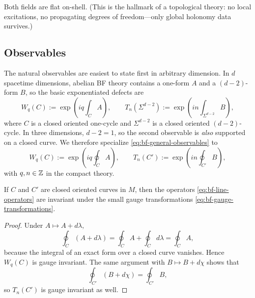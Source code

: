\noindent Both fields are flat on-shell.  (This is the hallmark of a topological theory: no local excitations, no propagating degrees of freedom---only global holonomy data survives.)

\subsection{Observables}

The natural observables are easiest to state first in arbitrary dimension. In $d$ spacetime dimensions, abelian BF theory contains a one-form $A$ and a $(d-2)$-form $B$, so the basic exponentiated defects are
\begin{equation}\label{eq:bf-general-observables}
W_q(C) := \exp\!\left(iq\int_C A\right),
\qquad
T_n(\Sigma^{d-2}) := \exp\!\left(in\int_{\Sigma^{d-2}} B\right),
\end{equation}
where $C$ is a closed oriented one-cycle and $\Sigma^{d-2}$ is a closed oriented $(d-2)$-cycle. In three dimensions, $d-2=1$, so the second observable is \emph{also} supported on a closed curve. We therefore specialize \eqref{eq:bf-general-observables} to
\begin{equation}\label{eq:bf-line-operators}
W_q(C) := \exp\!\left(iq\oint_C A\right),
\qquad
T_n(C') := \exp\!\left(in\oint_{C'} B\right),
\end{equation}
with $q,n\in \mathbb{Z}$ in the compact theory.

\begin{proposition}\label{prop:bf-obs-gauge}
If $C$ and $C'$ are closed oriented curves in $M$, then the operators \eqref{eq:bf-line-operators} are invariant under the small gauge transformations \eqref{eq:bf-gauge-transformations}.
\end{proposition}

\begin{proof}
Under $A\mapsto A+d\lambda$,
\begin{equation*}
\oint_C (A+d\lambda)
=
\oint_C A + \oint_C d\lambda
=
\oint_C A,
\end{equation*}
because the integral of an exact form over a closed curve vanishes. Hence $W_q(C)$ is gauge invariant. The same argument with $B\mapsto B+d\chi$ shows that
\begin{equation*}
\oint_{C'} (B+d\chi)=\oint_{C'}B,
\end{equation*}
so $T_n(C')$ is gauge invariant as well.
\end{proof}


